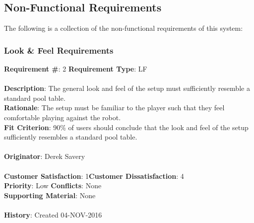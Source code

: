 \documentclass[titlepage]{article}
\begin{document}
\newpage
\subsection{Non-Functional Requirements}
The following is a collection of the non-functional requirements of this system:
\subsubsection{Look \& Feel Requirements}
\begin{framed}
	\noindent\textbf{Requirement \#}: 2 \hfill \textbf{Requirement Type}: LF \hfill\\\\
	\noindent\textbf{Description}: The general look and feel of the setup must sufficiently resemble a standard pool table.\\
	\textbf{Rationale}: The setup must be familiar to the player such that they feel comfortable playing against the robot.\\
	\textbf{Fit Criterion}: 90\% of users should conclude that the look and feel of the setup sufficiently resembles a standard pool table.\\\\
	\textbf{Originator}: Derek Savery\\\\
	\noindent\textbf{Customer Satisfaction}: 1\hfill 	\textbf{Customer Dissatisfaction}: 4 \hfill\\
	\textbf{Priority}: Low \hfill \textbf{Conflicts}: None \hfill\\
	\textbf{Supporting Material}: None\\\\
	\noindent\textbf{History}: Created 04-NOV-2016
\end{framed}
\end{document}
